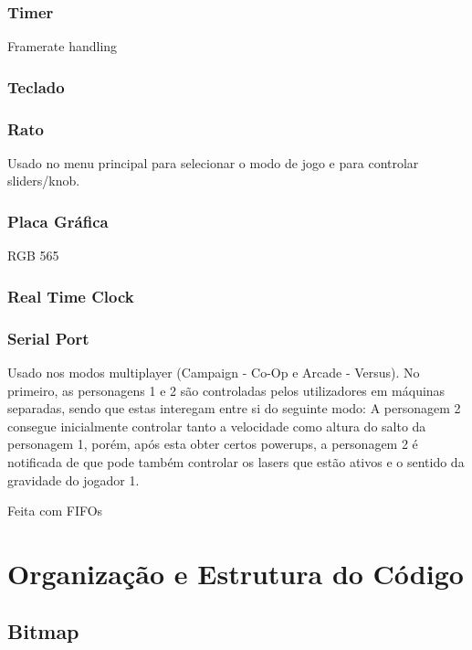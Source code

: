 \documentclass{report}
\begin{document}
\subsection{Timer}

Framerate handling

\subsection{Teclado}

\subsection{Rato}

Usado no menu principal para selecionar o modo de jogo e para controlar sliders/knob.

\subsection{Placa Gráfica}

RGB 565

\subsection{Real Time Clock}

\subsection{Serial Port}

Usado nos modos multiplayer (Campaign - Co-Op e Arcade - Versus). No primeiro, as personagens 1 e 2 são controladas pelos utilizadores em máquinas separadas, sendo que estas interegam entre si do seguinte modo: A personagem 2 consegue inicialmente controlar tanto a velocidade como altura do salto da personagem 1,
porém, após esta obter certos powerups, a personagem 2 é notificada de que pode também controlar os lasers que estão ativos e o sentido da gravidade do jogador 1.

Feita com FIFOs

\chapter{Organização e Estrutura do Código}

\section{Bitmap}
\end{document}
